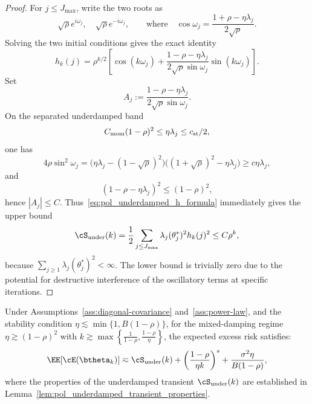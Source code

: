 \documentclass[11pt]{article}
\begin{document}
\begin{proof}
For $j \le J_{\max}$, write the two roots as
\[
    \sqrt{\rho}e^{i\omega_j},
    \quad
    \sqrt{\rho}e^{-i\omega_j},
    \qquad \text{where} \quad
    \cos \omega_j=\frac{1+\rho-\eta\lambda_j}{2\sqrt \rho}.
\]
Solving the two initial conditions gives the exact identity
\begin{equation}
\label{eq:pol_underdamped_h_formula}
    h_k(j)
    =\rho^{k/2}
    \left[
        \cos(k\omega_j)
        +\frac{1-\rho-\eta\lambda_j}{2\sqrt{\rho}\sin \omega_j}
        \sin(k\omega_j)
    \right].
\end{equation}
Set
\[
    A_j:=\frac{1-\rho-\eta\lambda_j}{2\sqrt{\rho}\sin \omega_j}.
\]
On the separated underdamped band
\[
    C_{\rm mom}(1-\rho)^2\le \eta\lambda_j\le c_{\rm st}/2,
\]
one has
\[
    4\rho\sin^2\omega_j
    =\bigl(\eta\lambda_j-(1-\sqrt\rho)^2\bigr)
     \bigl((1+\sqrt\rho)^2-\eta\lambda_j\bigr)
    \ge c\eta\lambda_j,
\]
and
\[
    (1-\rho-\eta\lambda_j)^2
    \le(1-\rho)^2,
\]
hence $|A_j|\le C$. 
Thus~\eqref{eq:pol_underdamped_h_formula} immediately gives the upper bound
\begin{equation*}
    \cS_{\mathrm{under}}(k) = \frac{1}{2} \sum_{j \le J_{\max}}
    \lambda_j(\theta_j^*)^2h_k(j)^2
    \le
    C\rho^k,
\end{equation*}
because $\sum_{j\ge1}\lambda_j(\theta_j^*)^2<\infty$. The lower bound is trivially zero due to the potential for destructive interference of the oscillatory terms at specific iterations.
\end{proof}

\begin{theorem}
\label{thm:pol_two_sided_scaling}
Under Assumptions~\ref{ass:diagonal-covariance} and~\ref{ass:power-law}, and the stability condition $\eta \lesssim \min\{1,B(1-\rho)\}$, for the mixed-damping regime $\eta\gtrsim(1-\rho)^2$ with $k \gtrsim \max\left\{\frac{1}{1-\rho}, \frac{1-\rho}{\eta}\right\}$, the expected excess risk satisfies:
\begin{equation}
\label{eq:pol_mixed_scaling_law}
    \EE[\cE(\btheta_k)] \eqsim \cS_{\mathrm{under}}(k) + \left(\frac{1-\rho}{\eta k}\right)^s + \frac{\sigma^2\eta}{B(1-\rho)},
\end{equation}
where the properties of the underdamped transient $\cS_{\mathrm{under}}(k)$ are established in Lemma~\ref{lem:pol_underdamped_transient_properties}.
\end{theorem}
\end{document}
